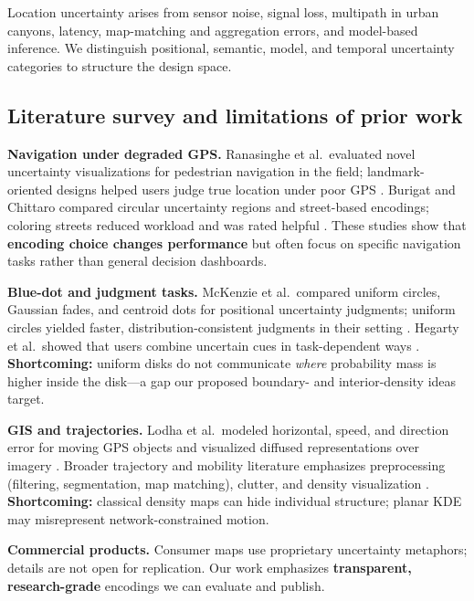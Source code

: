 \documentclass[12pt,a4paper]{article}
\begin{document}
Location uncertainty arises from sensor noise, signal loss, multipath in urban canyons, latency, map-matching and aggregation errors, and model-based inference. We distinguish positional, semantic, model, and temporal uncertainty categories to structure the design space.

\subsection*{Literature survey and limitations of prior work}

\textbf{Navigation under degraded GPS.} Ranasinghe et al.\ evaluated novel uncertainty visualizations for pedestrian navigation in the field; landmark-oriented designs helped users judge true location under poor GPS \cite{ranasinghe2019visualising}. Burigat and Chittaro compared circular uncertainty regions and street-based encodings; coloring streets reduced workload and was rated helpful \cite{burigat2011pedestrian}. These studies show that \textbf{encoding choice changes performance} but often focus on specific navigation tasks rather than general decision dashboards.

\textbf{Blue-dot and judgment tasks.} McKenzie et al.\ compared uniform circles, Gaussian fades, and centroid dots for positional uncertainty judgments; uniform circles yielded faster, distribution-consistent judgments in their setting \cite{mckenzie2016assessing}. Hegarty et al.\ showed that users combine uncertain cues in task-dependent ways \cite{hegarty2016where}. \textbf{Shortcoming:} uniform disks do not communicate \emph{where} probability mass is higher inside the disk---a gap our proposed boundary- and interior-density ideas target.

\textbf{GIS and trajectories.} Lodha et al.\ modeled horizontal, speed, and direction error for moving GPS objects and visualized diffused representations over imagery \cite{lodha2002visualization}. Broader trajectory and mobility literature emphasizes preprocessing (filtering, segmentation, map matching), clutter, and density visualization \cite{Zheng2015,Sobral2019,Fadloun2022,Feng2021,MillardBall2019}. \textbf{Shortcoming:} classical density maps can hide individual structure; planar KDE may misrepresent network-constrained motion.

\textbf{Commercial products.} Consumer maps use proprietary uncertainty metaphors; details are not open for replication. Our work emphasizes \textbf{transparent, research-grade} encodings we can evaluate and publish.
\end{document}
